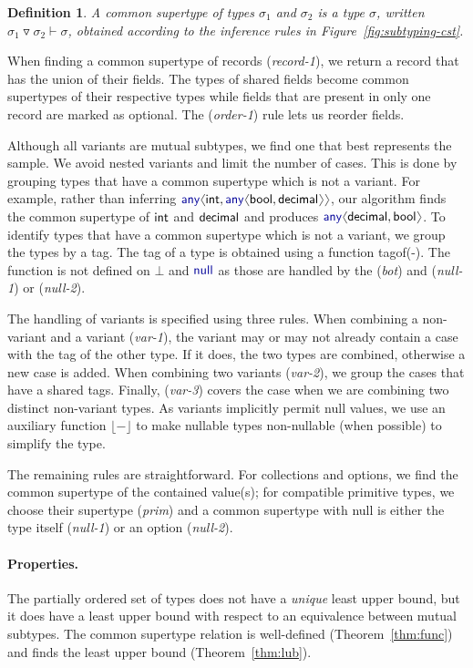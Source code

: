 \documentclass[10pt,preprint,blind,clearpagebib]{sigplanconf}
\newcommand{\langl}{\begin{picture}(4.5,7)
\put(1.1,2.5){\rotatebox{60}{\line(1,0){5.5}}}
\put(1.1,2.5){\rotatebox{300}{\line(1,0){5.5}}}
\end{picture}}
\newcommand{\rangl}{\begin{picture}(4.5,7)
\put(.9,2.5){\rotatebox{120}{\line(1,0){5.5}}}
\put(.9,2.5){\rotatebox{240}{\line(1,0){5.5}}}
\end{picture}}
\newcommand{\kvd}[1]{\textnormal{\textcolor{kvdclr}{\sffamily #1}}}
\newcommand{\ident}[1]{\textnormal{\sffamily #1}}
\newcommand{\dropopt}[1]{\lfloor#1\rfloor}
\newcommand{\tytagof}{\ident{tagof}}
\newtheorem{definition}{Definition}
\begin{document}
\begin{definition}
A \emph{common supertype} of types $\sigma_1$ and $\sigma_2$ is a type $\sigma$, written 
$\sigma_1 \triangledown \sigma_2 \vdash \sigma$, obtained according to the inference rules in 
Figure~\ref{fig:subtyping-cst}.
\end{definition}

\noindent
When finding a common supertype of records (\emph{record-1}), we return a record that has the 
union of their fields. The types of shared fields become common supertypes of their respective 
types while fields that are present in only one record are marked as optional. The (\emph{order-1})
rule lets us reorder fields.

Although all variants are mutual subtypes, we find one that best represents the sample. We avoid
nested variants and limit the number of cases. This is done by grouping types 
that have a common supertype which is not a variant. For example, rather than inferring 
$\kvd{any}\langl\ident{int}, \kvd{any}\langl\ident{bool}, \ident{decimal}\rangl\rangl$, 
our algorithm finds the common supertype of $\ident{int}$ and $\ident{decimal}$ and produces 
$\kvd{any}\langl\ident{decimal},\ident{bool}\rangl$. To identify types that have a common supertype 
which is not a variant, we group the types by a tag. The tag of a type is obtained using a function 
\tytagof{(-)}. The function is not defined on $\bot$ and $\kvd{null}$ as those are handled by the 
(\emph{bot}) and (\emph{null-1}) or (\emph{null-2}).

The handling of variants is specified using three rules. When combining a non-variant and a
variant (\emph{var-1}), the variant may or may not already contain a case with the tag of the other
type. If it does, the two types are combined, otherwise a new case is added.
When combining two variants (\emph{var-2}), we group the cases that have a shared tags.
Finally, (\emph{var-3}) covers the case when we are combining two distinct non-variant types.
As variants implicitly permit \kvd{null} values, we use an auxiliary function $\dropopt{-}$ to
make nullable types non-nullable (when possible) to simplify the type.

The remaining rules are straightforward. For collections and options, we find the common supertype 
of the contained value(s); for compatible primitive types, we choose their supertype (\emph{prim})
and a common supertype with \kvd{null} is either the type itself (\emph{null-1}) or an option 
(\emph{null-2}).

\paragraph{Properties.}
The partially ordered set of types does not have a \emph{unique} least upper bound, but it does 
have a least upper bound with respect to an equivalence between mutual subtypes. The common 
supertype relation is well-defined (Theorem~\ref{thm:func}) and finds the least upper bound 
(Theorem~\ref{thm:lub}). 
\end{document}
